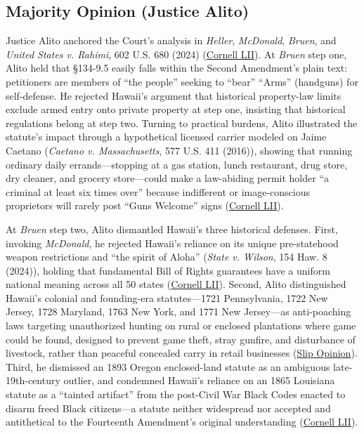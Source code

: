 \documentclass[12pt]{article}
\begin{document}
\subsection{Majority Opinion (Justice Alito)}
Justice Alito anchored the Court's analysis in \textit{Heller}, \textit{McDonald}, \textit{Bruen}, and \textit{United States v. Rahimi}, 602 U.S. 680 (2024) (\href{https://www.law.cornell.edu/supremecourt/text/24-1046}{Cornell LII}). At \textit{Bruen} step one, Alito held that \S{}134-9.5 easily falls within the Second Amendment's plain text: petitioners are members of ``the people'' seeking to ``bear'' ``Arms'' (handguns) for self-defense. He rejected Hawaii's argument that historical property-law limits exclude armed entry onto private property at step one, insisting that historical regulations belong at step two. Turning to practical burdens, Alito illustrated the statute's impact through a hypothetical licensed carrier modeled on Jaime Caetano (\textit{Caetano v. Massachusetts}, 577 U.S. 411 (2016)), showing that running ordinary daily errands---stopping at a gas station, lunch restaurant, drug store, dry cleaner, and grocery store---could make a law-abiding permit holder ``a criminal at least six times over'' because indifferent or image-conscious proprietors will rarely post ``Guns Welcome'' signs (\href{https://www.law.cornell.edu/supremecourt/text/24-1046}{Cornell LII}).

At \textit{Bruen} step two, Alito dismantled Hawaii's three historical defenses. First, invoking \textit{McDonald}, he rejected Hawaii's reliance on its unique pre-statehood weapon restrictions and ``the spirit of Aloha'' (\textit{State v. Wilson}, 154 Haw. 8 (2024)), holding that fundamental Bill of Rights guarantees have a uniform national meaning across all 50 states (\href{https://www.law.cornell.edu/supremecourt/text/24-1046}{Cornell LII}). Second, Alito distinguished Hawaii's colonial and founding-era statutes---1721 Pennsylvania, 1722 New Jersey, 1728 Maryland, 1763 New York, and 1771 New Jersey---as anti-poaching laws targeting unauthorized hunting on rural or enclosed plantations where game could be found, designed to prevent game theft, stray gunfire, and disturbance of livestock, rather than peaceful concealed carry in retail businesses (\href{https://www.supremecourt.gov/opinions/25pdf/24-1046_nmio.pdf}{Slip Opinion}). Third, he dismissed an 1893 Oregon enclosed-land statute as an ambiguous late-19th-century outlier, and condemned Hawaii's reliance on an 1865 Louisiana statute as a ``tainted artifact'' from the post-Civil War Black Codes enacted to disarm freed Black citizens---a statute neither widespread nor accepted and antithetical to the Fourteenth Amendment's original understanding (\href{https://www.law.cornell.edu/supremecourt/text/24-1046}{Cornell LII}).
\end{document}
